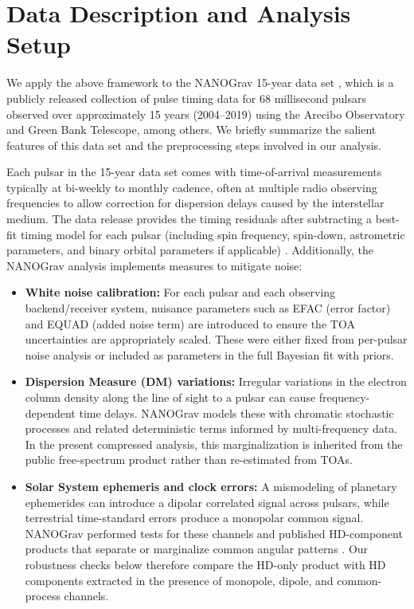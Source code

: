 \documentclass[symmetry,article,submit,pdftex,moreauthors]{Definitions/mdpi}
\begin{document}
\section{Data Description and Analysis Setup}\label{sec:data}
We apply the above framework to the NANOGrav 15-year data set \cite{NANOGrav15-Data,NANOGrav15-Evidence,NANOGrav15-NewPhys}, which is a publicly released collection of pulse timing data for 68 millisecond pulsars observed over approximately 15 years (2004--2019) using the Arecibo Observatory and Green Bank Telescope, among others. We briefly summarize the salient features of this data set and the preprocessing steps involved in our analysis.

Each pulsar in the 15-year data set comes with time-of-arrival measurements typically at bi-weekly to monthly cadence, often at multiple radio observing frequencies to allow correction for dispersion delays caused by the interstellar medium. The data release provides the timing residuals after subtracting a best-fit timing model for each pulsar (including spin frequency, spin-down, astrometric parameters, and binary orbital parameters if applicable) \cite{NANOGrav15-Data}. Additionally, the NANOGrav analysis implements measures to mitigate noise:
\begin{itemize}
    \item \textbf{White noise calibration:} For each pulsar and each observing backend/receiver system, nuisance parameters such as EFAC (error factor) and EQUAD (added noise term) are introduced to ensure the TOA uncertainties are appropriately scaled. These were either fixed from per-pulsar noise analysis or included as parameters in the full Bayesian fit with priors.
    \item \textbf{Dispersion Measure (DM) variations:} Irregular variations in the electron column density along the line of sight to a pulsar can cause frequency-dependent time delays. NANOGrav models these with chromatic stochastic processes and related deterministic terms informed by multi-frequency data. In the present compressed analysis, this marginalization is inherited from the public free-spectrum product rather than re-estimated from TOAs.
    \item \textbf{Solar System ephemeris and clock errors:} A mismodeling of planetary ephemerides can introduce a dipolar correlated signal across pulsars, while terrestrial time-standard errors produce a monopolar common signal. NANOGrav performed tests for these channels and published HD-component products that separate or marginalize common angular patterns \cite{NANOGrav15-Evidence}. Our robustness checks below therefore compare the HD-only product with HD components extracted in the presence of monopole, dipole, and common-process channels.
\end{itemize}
\end{document}
